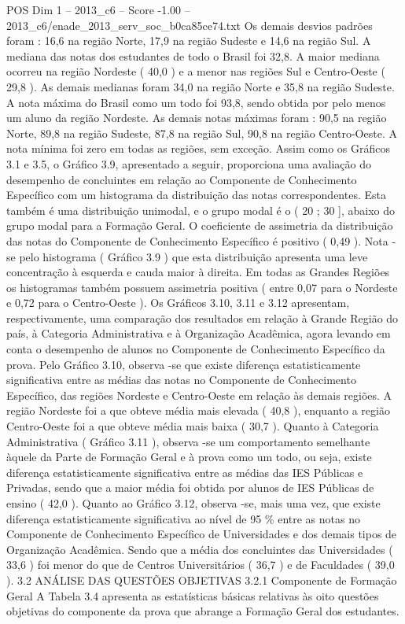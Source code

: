 \begin{textsample}{POS Dim 1 – 2013\_c6 – Score -1.00 – 2013\_c6/enade\_2013\_serv\_soc\_b0ca85ce74.txt}
Os demais desvios padrões foram : 16,6 na região Norte, 17,9 na região Sudeste e 14,6 na região Sul.
A mediana das notas dos estudantes de todo o Brasil foi 32,8.
A maior mediana ocorreu na região Nordeste ( 40,0 ) e a menor nas regiões Sul e Centro-Oeste ( 29,8 ).
As demais medianas foram 34,0 na região Norte e 35,8 na região Sudeste.
A nota máxima do Brasil como um todo foi 93,8, sendo obtida por pelo menos um aluno da região Nordeste.
As demais notas máximas foram : 90,5 na região Norte, 89,8 na região Sudeste, 87,8 na região Sul, 90,8 na região Centro-Oeste.
A nota mínima foi zero em todas as regiões, sem exceção.
Assim como os Gráficos 3.1 e 3.5, o Gráfico 3.9, apresentado a seguir, proporciona uma avaliação do desempenho de concluintes em relação ao Componente de Conhecimento Específico com um histograma da distribuição das notas correspondentes.
Esta também é uma distribuição unimodal, e o grupo modal é o ( 20 ; 30 ], abaixo do grupo modal para a Formação Geral.
O coeficiente de assimetria da distribuição das notas do Componente de Conhecimento Específico é positivo ( 0,49 ).
Nota -se pelo histograma ( Gráfico 3.9 ) que esta distribuição apresenta uma leve concentração à esquerda e cauda maior à direita.
Em todas as Grandes Regiões os histogramas também possuem assimetria positiva ( entre 0,07 para o Nordeste e 0,72 para o Centro-Oeste ).
Os Gráficos 3.10, 3.11 e 3.12 apresentam, respectivamente, uma comparação dos resultados em relação à Grande Região do país, à Categoria Administrativa e à Organização Acadêmica, agora levando em conta o desempenho de alunos no Componente de Conhecimento Específico da prova.
Pelo Gráfico 3.10, observa -se que existe diferença estatisticamente significativa entre as médias das notas no Componente de Conhecimento Específico, das regiões Nordeste e Centro-Oeste em relação às demais regiões.
A região Nordeste foi a que obteve média mais elevada ( 40,8 ), enquanto a região Centro-Oeste foi a que obteve média mais baixa ( 30,7 ).
Quanto à Categoria Administrativa ( Gráfico 3.11 ), observa -se um comportamento semelhante àquele da Parte de Formação Geral e à prova como um todo, ou seja, existe diferença estatisticamente significativa entre as médias das IES Públicas e Privadas, sendo que a maior média foi obtida por alunos de IES Públicas de ensino ( 42,0 ).
Quanto ao Gráfico 3.12, observa -se, mais uma vez, que existe diferença estatisticamente significativa ao nível de 95 \% entre as notas no Componente de Conhecimento Específico de Universidades e dos demais tipos de Organização Acadêmica.
Sendo que a média dos concluintes das Universidades ( 33,6 ) foi menor do que de Centros Universitários ( 36,7 ) e de Faculdades ( 39,0 ). 3.2 ANÁLISE DAS QUESTÕES OBJETIVAS 3.2.1 Componente de Formação Geral A Tabela 3.4 apresenta as estatísticas básicas relativas às oito questões objetivas do componente da prova que abrange a Formação Geral dos estudantes.

\end{textsample}
